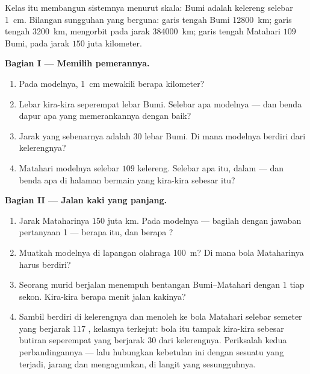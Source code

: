 \begin{problem}\label{pb:g6:sun-earth-moon:1}
Kelas itu membangun sistemnya menurut skala: Bumi adalah kelereng
selebar \qty{1}{cm}. Bilangan sungguhan yang berguna: garis tengah
Bumi \qty{12800}{km}; garis tengah  \qty{3200}{km}, mengorbit
pada jarak \qty{384000}{km}; garis tengah Matahari $109$ Bumi, pada
jarak $150$ juta kilometer.

\medskip\noindent\textbf{Bagian I --- Memilih pemerannya.}
\begin{enumerate}
  \item Pada modelnya, \qty{1}{cm} mewakili berapa kilometer?
  \item Lebar  kira-kira seperempat lebar Bumi. Selebar apa
         modelnya --- dan benda dapur apa yang memerankannya
        dengan baik?
  \item Jarak  yang sebenarnya adalah $30$ lebar Bumi. Di mana
         modelnya berdiri dari kelerengnya?
  \item Matahari modelnya selebar $109$ kelereng. Selebar apa itu,
        dalam  --- dan benda apa di halaman bermain yang
        kira-kira sebesar itu?
\end{enumerate}

\medskip\noindent\textbf{Bagian II --- Jalan kaki yang panjang.}
\begin{enumerate}[resume]
  \item Jarak Mataharinya $150$ juta km. Pada modelnya --- bagilah
        dengan jawaban pertanyaan 1 --- berapa  itu, dan
        berapa ?
  \item Muatkah modelnya di lapangan olahraga \qty{100}{m}? Di mana
        bola Mataharinya harus berdiri?
  \item Seorang murid berjalan menempuh bentangan Bumi--Matahari
        dengan $1$  tiap sekon. Kira-kira berapa menit jalan
        kakinya?
  \item Sambil berdiri di kelerengnya dan menoleh ke bola Matahari
        selebar semeter yang berjarak $117$ , kelasnya terkejut:
        bola itu tampak kira-kira sebesar butiran  seperempat
         yang berjarak $30$  dari kelerengnya.
        Periksalah kedua perbandingannya --- lalu hubungkan kebetulan
        ini dengan sesuatu yang terjadi, jarang dan mengagumkan, di
        langit yang sesungguhnya.
\end{enumerate}


\end{problem}
